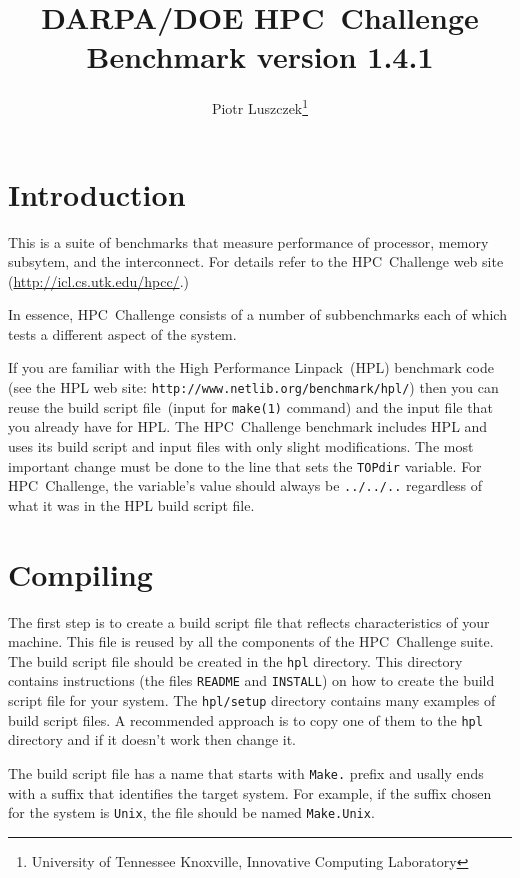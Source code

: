 \documentclass[twocolumn]{article}
\begin{document}
\title{DARPA/DOE HPC~Challenge Benchmark version 1.4.1}
\author{Piotr Luszczek\footnote{University of Tennessee Knoxville, Innovative
Computing Laboratory}}
\maketitle

\section{Introduction}
This is a suite of benchmarks that measure performance of processor,
memory subsytem, and the interconnect. For details refer to the
HPC~Challenge web site (\url{http://icl.cs.utk.edu/hpcc/}.)

In essence, HPC~Challenge consists of a number of subbenchmarks each
of which tests a different aspect of the system.

If you are familiar with the High Performance Linpack~(HPL) benchmark
code (see the HPL web site:
\texttt{http://www.netlib.org/benchmark/hpl/}) then you can reuse the
build script file~(input for \texttt{make(1)} command) and the input
file that you already have for HPL. The HPC~Challenge benchmark
includes HPL and uses its build script and input files with only
slight modifications. The most important change must be done to the
line that sets the \texttt{TOPdir} variable. For HPC~Challenge, the
variable's value should always be \texttt{../../..} regardless of what
it was in the HPL build script file.

\section{Compiling}
The first step is to create a build script file that reflects
characteristics of your machine. This file is reused by all the
components of the HPC~Challenge suite. The build script file should be
created in the \texttt{hpl} directory. This directory contains
instructions (the files \texttt{README} and \texttt{INSTALL}) on how
to create the build script file for your system. The
\texttt{hpl/setup} directory contains many examples of build script
files. A recommended approach is to copy one of them to the
\texttt{hpl} directory and if it doesn't work then change it.

The build script file has a name that starts with \texttt{Make.}
prefix and usally ends with a suffix that identifies the target
system. For example, if the suffix chosen for the system is
\texttt{Unix}, the file should be named \texttt{Make.Unix}.
\end{document}
